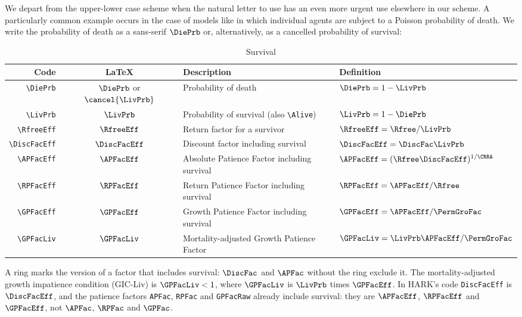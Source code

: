 \documentclass{econark}
\begin{document}
We depart from the upper-lower case scheme when the natural letter to use has an even more urgent use elsewhere in our scheme.
A particularly common example occurs in the case of models like \cite{blanchardFinite} in which
individual agents are subject to a Poisson probability of death.  We write the probability of death
as a sans-serif $\DiePrb$ or, alternatively, as a cancelled probability of survival:
\begin{table}[ht]
  \centering
  \begin{tabular}{|>{\ttfamily}rcll|}
    \hline
    Code & \LaTeX & Description & Definition
    \\ \hline
    \verb|\DiePrb|        & $\DiePrb$ or $\cancel{\LivPrb}$ & Probability of death & $\DiePrb=1-\LivPrb$
    \\ \verb|\LivPrb|     & $\LivPrb$     & Probability of survival (also \verb|\Alive|) & $\LivPrb=1-\DiePrb$
    \\ \verb|\RfreeEff|   & $\RfreeEff$   & Return factor for a survivor & $\RfreeEff=\Rfree/\LivPrb$
    \\ \verb|\DiscFacEff| & $\DiscFacEff$ & Discount factor including survival & $\DiscFacEff=\DiscFac\LivPrb$
    \\ \verb|\APFacEff|   & $\APFacEff$   & Absolute Patience Factor including survival & $\APFacEff=(\Rfree\DiscFacEff)^{1/\CRRA}$
    \\ \verb|\RPFacEff|   & $\RPFacEff$   & Return Patience Factor including survival & $\RPFacEff=\APFacEff/\Rfree$
    \\ \verb|\GPFacEff|   & $\GPFacEff$   & Growth Patience Factor including survival & $\GPFacEff=\APFacEff/\PermGroFac$
    \\ \verb|\GPFacLiv|   & $\GPFacLiv$   & Mortality-adjusted Growth Patience Factor & $\GPFacLiv=\LivPrb\APFacEff/\PermGroFac$
    \\	\hline
  \end{tabular}
  \caption{Survival}
  \label{table:SpecialFactors}
\end{table}

A ring marks the version of a factor that includes survival: $\DiscFac$ and $\APFac$ without the ring exclude it.  The mortality-adjusted growth impatience condition (GIC-Liv) is ${\GPFacLiv<1}$, where $\GPFacLiv$ is $\LivPrb$ times $\GPFacEff$.  In HARK's code \texttt{DiscFacEff} is $\DiscFacEff$, and the patience factors \texttt{APFac}, \texttt{RPFac} and \texttt{GPFacRaw} already include survival: they are $\APFacEff$, $\RPFacEff$ and $\GPFacEff$, not $\APFac$, $\RPFac$ and $\GPFac$.
\end{document}
